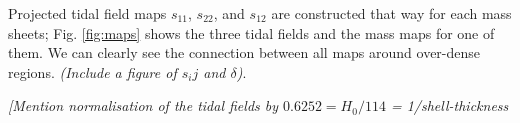 
Projected tidal field maps $s_{11}$, $s_{22}$, and $s_{12}$ are constructed that way for each mass sheets; Fig. \ref{fig:maps} shows the  three tidal fields and the mass maps for one of them.
We can clearly see the connection between all maps around over-dense regions. {\it (Include a figure of $s_ij$ and $\delta$)}. 

{\it [Mention normalisation of the tidal fields by $0.6252 = H_0/114$ = 1/shell-thickness}


